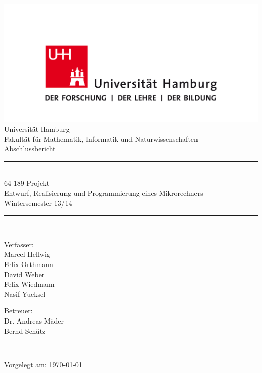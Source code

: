 \documentclass[11pt,a4paper,twoside,openright,headinclude,bibtotoc,bigheadings,final]{scrreprt}
\begin{document}
\begin{fullsizetitle} %
\centering
\begin{minipage}{0.75\textwidth}
\begin{center}
\includegraphics[width=\textwidth]{images/uhh.png}\\
{\LARGE Universität Hamburg}\\[.25em]
{\Large Fakultät für Mathematik, Informatik und Naturwissenschaften}\\[3em]
{\Huge Abschlussbericht}\\[3em]

\newcommand{\HRule}{\rule{\linewidth}{0.5mm}}
\HRule\\[.4em]
{\Large%
64-189 Projekt\\%
Entwurf, Realisierung und Programmierung eines Mikrorechners\\%
Wintersemester 13/14\\%
}
\HRule\\[3em]

\begin{minipage}[t]{0.4\textwidth}
\begin{flushleft} \large
Verfasser:\\[1em]%
Marcel Hellwig\\%
Felix Orthmann\\%
David Weber\\%
Felix Wiedmann\\%
Nasif Yueksel%
\end{flushleft}
\end{minipage}
\hfill
\begin{minipage}[t]{0.4\textwidth}
\begin{flushright} \large
Betreuer:\\[1em]
Dr. Andreas Mäder\\%
Bernd Schütz%
\end{flushright}
\end{minipage} \\[20em]

\vspace*{\fill}

{\large Vorgelegt am: \today}
\end{center}
\end{minipage}
\end{fullsizetitle}
\newpage
\end{document}
